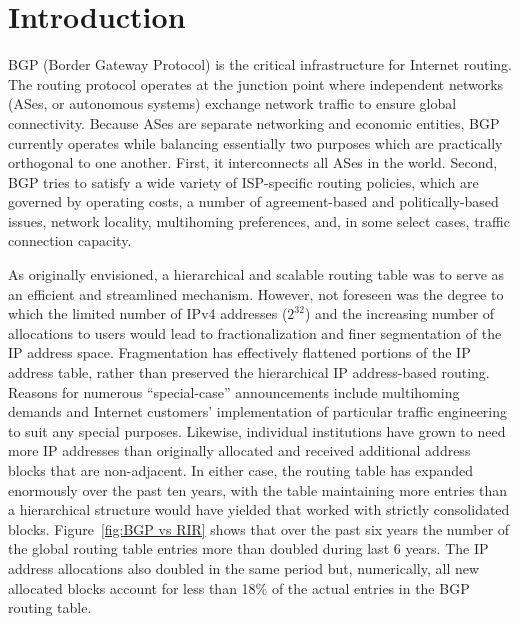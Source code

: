 \section{Introduction}

BGP (Border Gateway Protocol) \cite{Rekhter:1995:RFC1771-BGP} is the critical
infrastructure for Internet routing. The routing protocol operates at the
junction point where independent networks (ASes, or autonomous systems)
exchange network traffic to ensure global connectivity. Because ASes are
separate networking and economic entities, BGP currently operates while
balancing essentially two purposes which are practically orthogonal to one
another. First, it interconnects all ASes in the world. Second, BGP tries to
satisfy a wide variety of ISP-specific routing policies, which are governed by
operating costs, a number of agreement-based and politically-based issues,
network locality, multihoming preferences, and, in some select cases, traffic
connection capacity. 


As originally envisioned, a hierarchical and scalable routing table was to
serve as an efficient and streamlined mechanism. However, not foreseen was the
degree to which the limited number of IPv4 addresses ($2^{32}$) and the
increasing number of allocations to users would lead to fractionalization and
finer segmentation of the IP address space. Fragmentation has effectively
flattened portions of the IP address table, rather than preserved the
hierarchical IP address-based routing. Reasons for numerous ``special-case''
announcements include multihoming demands and Internet customers'
implementation of particular traffic engineering to suit any special purposes.
Likewise, individual institutions have grown to need more IP addresses than
originally allocated and received additional address blocks that are
non-adjacent. In either case, the routing table has expanded enormously over
the past ten years, with the table maintaining more entries than a
hierarchical structure would have yielded that worked with strictly
consolidated blocks. Figure~\ref{fig:BGP vs RIR} shows that over the past six
years the number of the global routing table entries more than doubled during
last 6 years. The IP address allocations also doubled in the same period but,
numerically, all new allocated blocks account for less than 18\% of the actual
entries in the BGP routing table. 

